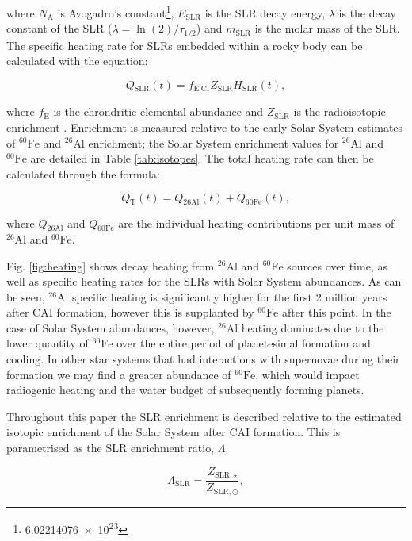 \documentclass[fleqn,usenatbib]{mnras}
\newcommand{\rms}[1]{\ensuremath{_{\text{#1}}}}
\newcommand{\atom}[2]{$^{#2}\text{#1}$}
\newcommand{\al}{\atom{Al}{26}}
\newcommand{\fe}{\atom{Fe}{60}}
\begin{document}
\noindent
where $N\rms{A}$ is Avogadro's constant\footnote{\num{6.02214076e23}}, $E\rms{SLR}$ is the SLR decay energy, $\lambda$ is the decay constant of the SLR ($\lambda = \ln(2) / \tau\rms{1/2}$) and $m\rms{SLR}$ is the molar mass of the SLR.
The specific heating rate for SLRs embedded within a rocky body can be calculated with the equation:

\begin{equation}
  \label{eq:heatingrate}
  Q\rms{SLR}(t) = f\rms{E,CI} Z\rms{SLR} H\rms{SLR}(t) ,
\end{equation}

\noindent
where $f\rms{E}$ is the chrondritic elemental abundance and $Z\rms{SLR}$ is the radioisotopic enrichment \citep{castillo-rogez26AlDecayHeat2009}.
Enrichment is measured relative to the early Solar System estimates of \fe{} and \al{} enrichment; the Solar System enrichment values for \al{} and \fe{} are detailed in Table \ref{tab:isotopes}.
The total heating rate can then be calculated through the formula:

\begin{equation}
  \label{eq:heatingbody}
  Q\rms{T}(t) = Q\rms{26Al}(t) + Q\rms{60Fe}(t) ,
\end{equation}

\noindent
where $Q\rms{26Al}$ and $Q\rms{60Fe}$ are the individual heating contributions per unit mass of \al{} and \fe{}.

Fig. \ref{fig:heating} shows decay heating from \al{} and \fe{} sources over time, as well as specific heating rates for the SLRs with Solar System abundances.
As can be seen, \al{} specific heating is significantly higher for the first 2 million years after CAI formation, however this is supplanted by \fe{} after this point.
In the case of Solar System abundances, however, \al{} heating dominates due to the lower quantity of \fe{} over the entire period of planetesimal formation and cooling.
In other star systems that had interactions with supernovae during their formation we may find a greater abundance of \fe{}, which would impact radiogenic heating and the water budget of subsequently forming planets.

Throughout this paper the SLR enrichment is described relative to the estimated isotopic enrichment of the Solar System after CAI formation.
This is parametrised as the SLR enrichment ratio, $\Lambda$.

\begin{equation}
  \Lambda\rms{SLR} = \frac{Z_{\text{SLR},\star}}{Z_{\text{SLR},\odot}} , 
\end{equation}
\end{document}
